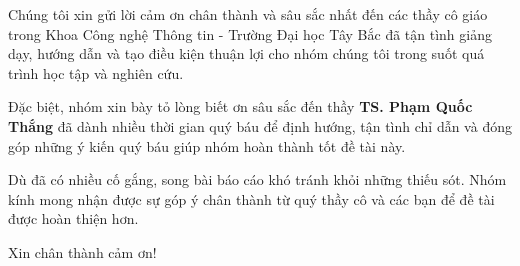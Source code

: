 \begin{acknowledgements}
  Chúng tôi xin gửi lời cảm ơn chân thành và sâu sắc nhất đến các thầy cô giáo trong Khoa Công nghệ Thông tin - Trường Đại học Tây Bắc đã tận tình giảng dạy, hướng dẫn và tạo điều kiện thuận lợi cho nhóm chúng tôi trong suốt quá trình học tập và nghiên cứu.

  Đặc biệt, nhóm xin bày tỏ lòng biết ơn sâu sắc đến thầy \textbf{TS. Phạm Quốc Thắng} đã dành nhiều thời gian quý báu để định hướng, tận tình chỉ dẫn và đóng góp những ý kiến quý báu giúp nhóm hoàn thành tốt đề tài này.

  Dù đã có nhiều cố gắng, song bài báo cáo khó tránh khỏi những thiếu sót. Nhóm kính mong nhận được sự góp ý chân thành từ quý thầy cô và các bạn để đề tài được hoàn thiện hơn.

  Xin chân thành cảm ơn!
\end{acknowledgements}
